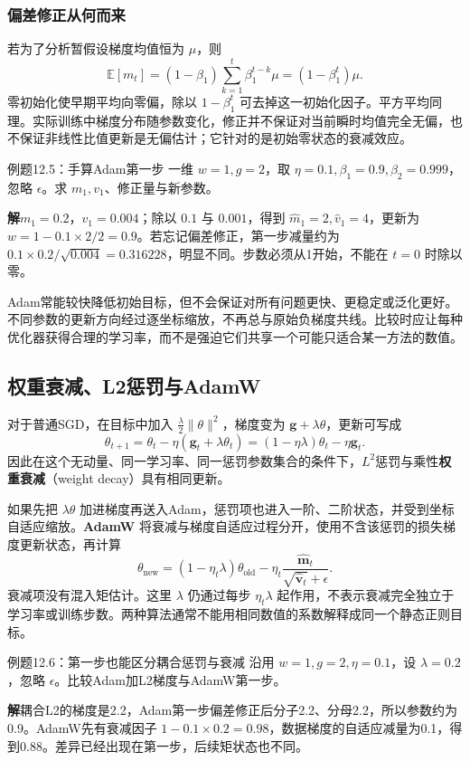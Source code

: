 \documentclass[UTF8,fontset=none,zihao=-4,a4paper]{ctexart}
\newcommand{\term}[1]{\textbf{#1}}
\newcommand{\sol}{\par\noindent\textbf{解}\quad}
\numberwithin{equation}{section}
\numberwithin{figure}{section}
\begin{document}
\subsubsection{偏差修正从何而来}
若为了分析暂假设梯度均值恒为 $\mu$，则
\[
 \mathbb E[m_t]=(1-\beta_1)\sum_{k=1}^t\beta_1^{t-k}\mu
 =(1-\beta_1^t)\mu.
\]
零初始化使早期平均向零偏，除以 $1-\beta_1^t$ 可去掉这一初始化因子。平方平均同理。实际训练中梯度分布随参数变化，修正并不保证对当前瞬时均值完全无偏，也不保证非线性比值更新是无偏估计；它针对的是初始零状态的衰减效应。

\begin{infobox}{例题12.5：手算Adam第一步}
一维 $w=1,g=2$，取 $\eta=0.1,\beta_1=0.9,\beta_2=0.999$，忽略 $\epsilon$。求 $m_1,v_1$、修正量与新参数。
\end{infobox}
\sol $m_1=0.2$，$v_1=0.004$；除以 $0.1$ 与 $0.001$，得到 $\widehat m_1=2,\widehat v_1=4$，更新为 $w=1-0.1\times2/2=0.9$。若忘记偏差修正，第一步减量约为 $0.1\times0.2/\sqrt{0.004}=0.316228$，明显不同。步数必须从1开始，不能在 $t=0$ 时除以零。

Adam常能较快降低初始目标，但不会保证对所有问题更快、更稳定或泛化更好。不同参数的更新方向经过逐坐标缩放，不再总与原始负梯度共线。比较时应让每种优化器获得合理的学习率，而不是强迫它们共享一个可能只适合某一方法的数值。

\subsection{权重衰减、L2惩罚与AdamW}
对于普通SGD，在目标中加入 $\frac\lambda2\|\theta\|^2$，梯度变为 $\symbf g+\lambda\theta$，更新可写成
\[
 \theta_{t+1}=\theta_t-\eta(\symbf g_t+\lambda\theta_t)
 =(1-\eta\lambda)\theta_t-\eta\symbf g_t.
\]
因此在这个无动量、同一学习率、同一惩罚参数集合的条件下，$L^2$惩罚与乘性\term{权重衰减}（weight decay）具有相同更新。

如果先把 $\lambda\theta$ 加进梯度再送入Adam，惩罚项也进入一阶、二阶状态，并受到坐标自适应缩放。\term{AdamW} 将衰减与梯度自适应过程分开，使用不含该惩罚的损失梯度更新状态，再计算
\begin{equation}
 \theta_{\mathrm{new}}=(1-\eta_t\lambda)\theta_{\mathrm{old}}
 -\eta_t\frac{\widehat{\symbf m}_t}{\sqrt{\widehat{\symbf v}_t}+\epsilon}.
\end{equation}
衰减项没有混入矩估计。这里 $\lambda$ 仍通过每步 $\eta_t\lambda$ 起作用，不表示衰减完全独立于学习率或训练步数。两种算法通常不能用相同数值的系数解释成同一个静态正则目标。

\begin{infobox}{例题12.6：第一步也能区分耦合惩罚与衰减}
沿用 $w=1,g=2,\eta=0.1$，设 $\lambda=0.2$，忽略 $\epsilon$。比较Adam加L2梯度与AdamW第一步。
\end{infobox}
\sol 耦合L2的梯度是2.2，Adam第一步偏差修正后分子2.2、分母2.2，所以参数约为0.9。AdamW先有衰减因子 $1-0.1\times0.2=0.98$，数据梯度的自适应减量为0.1，得到0.88。差异已经出现在第一步，后续矩状态也不同。
\end{document}
